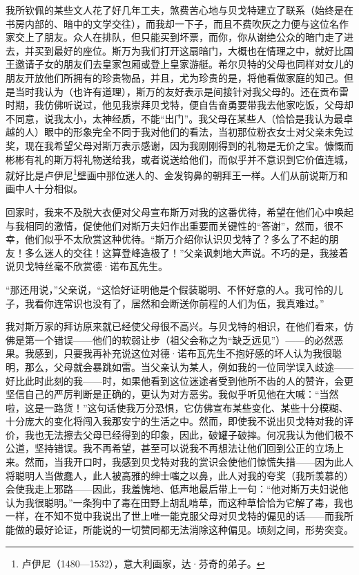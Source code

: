 \par 我所钦佩的某些文人花了好几年工夫，煞费苦心地与贝戈特建立了联系（始终是在书房内部的、暗中的文学交往），而我却一下子，而且不费吹灰之力便与这位名作家交上了朋友。众人在排队，但只能买到坏票，而你，你从谢绝公众的暗门走了进去，并买到最好的座位。斯万为我们打开这扇暗门，大概也在情理之中，就好比国王邀请子女的朋友们去皇家包厢或登上皇家游艇。希尔贝特的父母也同样对女儿的朋友开放他们所拥有的珍贵物品，并且，尤为珍贵的是，将他看做家庭的知己。但是当时我认为（也许有道理），斯万的友好表示是间接针对我父母的。还在贡布雷时期，我仿佛听说过，他见我崇拜贝戈特，便自告奋勇要带我去他家吃饭，父母却不同意，说我太小，太神经质，不能“出门”。我父母在某些人（恰恰是我认为最卓越的人）眼中的形象完全不同于我对他们的看法，当初那位粉衣女士对父亲未免过奖，现在我希望父母对斯万表示感谢，因为我刚刚得到的礼物是无价之宝。慷慨而彬彬有礼的斯万将礼物送给我，或者说送给他们，而似乎并不意识到它价值连城，就好比是卢伊尼\footnote{卢伊尼（1480—1532），意大利画家，达·芬奇的弟子。}壁画中那位迷人的、金发钩鼻的朝拜王一样。人们从前说斯万和画中人十分相似。
\par 回家时，我来不及脱大衣便对父母宣布斯万对我的这番优待，希望在他们心中唤起与我相同的激情，促使他们对斯万夫妇作出重要而关键性的“答谢”，然而，很不幸，他们似乎不太欣赏这种优待。“斯万介绍你认识贝戈特了？多么了不起的朋友！多么迷人的交往！这算登峰造极了！”父亲讽刺地大声说。不巧的是，我接着说贝戈特丝毫不欣赏德·诺布瓦先生。
\par “那还用说，”父亲说，“这恰好证明他是个假装聪明、不怀好意的人。我可怜的儿子，我看你连常识也没有了，居然和会断送你前程的人们为伍，我真难过。”
\par 我对斯万家的拜访原来就已经使父母很不高兴。与贝戈特的相识，在他们看来，仿佛是第一个错误——他们的软弱让步（祖父会称之为“缺乏远见”）——的必然恶果。我感到，只要我再补充说这位对德·诺布瓦先生不抱好感的坏人认为我很聪明，那么，父母就会暴跳如雷。当父亲认为某人，例如我的一位同学误入歧途——好比此时此刻的我——时，如果他看到这位迷途者受到他所不齿的人的赞许，会更坚信自己的严厉判断是正确的，更认为对方恶劣。我似乎听见他在大喊：“当然啦，这是一路货！”这句话使我万分恐惧，它仿佛宣布某些变化、某些十分模糊、十分庞大的变化将闯入我那安宁的生活之中。然而，即使我不说出贝戈特对我的评价，我也无法擦去父母已经得到的印象，因此，破罐子破摔。何况我认为他们极不公道，坚持错误。我不再希望，甚至可以说我不再想法让他们回到公正的立场上来。然而，当我开口时，我感到贝戈特对我的赏识会使他们惊慌失措——因为此人将聪明人当做蠢人，此人被高雅的绅士嗤之以鼻，此人对我的夸奖（我所羡慕的）会使我走上邪路——因此，我羞愧地、低声地最后带上一句：“他对斯万夫妇说他认为我很聪明。”一条狗中了毒在田野上胡乱啃草，而这种草恰恰为它解了毒，我也一样，在不知不觉中我说出了世上唯一能克服父母对贝戈特的偏见的话——而我所能做的最好论证，所能说的一切赞同都无法消除这种偏见。顷刻之间，形势突变。
